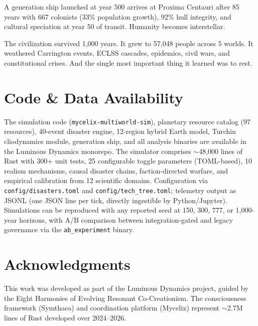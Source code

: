 \documentclass[12pt,a4paper]{article}
\begin{document}
A generation ship launched at year 500 arrives at Proxima Centauri after 85 years with 667 colonists (33\% population growth), 92\% hull integrity, and cultural speciation at year 50 of transit. Humanity becomes interstellar.

The civilization survived 1,000 years. It grew to 57,048 people across 5 worlds. It weathered Carrington events, ECLSS cascades, epidemics, civil wars, and constitutional crises. And the single most important thing it learned was to rest.


\section*{Code \& Data Availability}

The simulation code (\texttt{mycelix-multiworld-sim}), planetary resource catalog (97 resources), 40-event disaster engine, 12-region hybrid Earth model, Turchin cliodynamics module, generation ship, and all analysis binaries are available in the Luminous Dynamics monorepo. The simulator comprises $\sim$48,000 lines of Rust with 300+ unit tests, 25 configurable toggle parameters (TOML-based), 10 realism mechanisms, causal disaster chains, faction-directed warfare, and empirical calibration from 12 scientific domains. Configuration via \texttt{config/disasters.toml} and \texttt{config/tech\_tree.toml}; telemetry output as JSONL (one JSON line per tick, directly ingestible by Python/Jupyter). Simulations can be reproduced with any reported seed at 150, 300, 777, or 1,000-year horizons, with A/B comparison between integration-gated and legacy governance via the \texttt{ab\_experiment} binary.


\section*{Acknowledgments}

This work was developed as part of the Luminous Dynamics project, guided by the Eight Harmonies of Evolving Resonant Co-Creationism. The consciousness framework (Symthaea) and coordination platform (Mycelix) represent $\sim$2.7M lines of Rust developed over 2024--2026.
\end{document}
